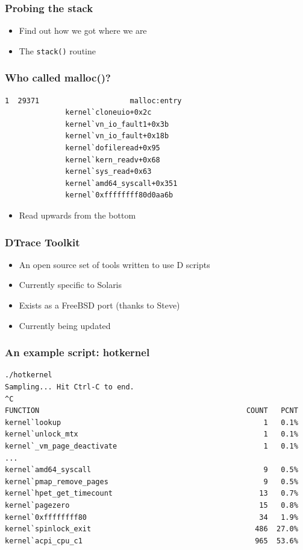 \documentclass[pdftex]{beamer} %
\begin{document}
\begin{frame}[fragile]
  \frametitle{Probing the stack}
  \begin{itemize}
  \item Find out how we got where we are
  \item The \verb+stack()+ routine
  \end{itemize}
\end{frame}

\begin{frame}[fragile]
  \frametitle{Who called malloc()?}
\begin{lstlisting}
1  29371                     malloc:entry 
              kernel`cloneuio+0x2c
              kernel`vn_io_fault1+0x3b
              kernel`vn_io_fault+0x18b
              kernel`dofileread+0x95
              kernel`kern_readv+0x68
              kernel`sys_read+0x63
              kernel`amd64_syscall+0x351
              kernel`0xffffffff80d0aa6b
\end{lstlisting}
  \begin{itemize}
  \item Read upwards from the bottom
  \end{itemize}
\end{frame}

\begin{frame}
  \frametitle{DTrace Toolkit}
  \begin{itemize}
  \item An open source set of tools written to use D scripts
  \item Currently specific to Solaris
  \item Exists as a FreeBSD port (thanks to Steve)
  \item Currently being updated
  \end{itemize}
\end{frame}

\begin{frame}[fragile]
  \frametitle{An example script: hotkernel}
\begin{lstlisting}
./hotkernel 
Sampling... Hit Ctrl-C to end.
^C
FUNCTION                                                COUNT   PCNT
kernel`lookup                                               1   0.1%
kernel`unlock_mtx                                           1   0.1%
kernel`_vm_page_deactivate                                  1   0.1%
...
kernel`amd64_syscall                                        9   0.5%
kernel`pmap_remove_pages                                    9   0.5%
kernel`hpet_get_timecount                                  13   0.7%
kernel`pagezero                                            15   0.8%
kernel`0xffffffff80                                        34   1.9%
kernel`spinlock_exit                                      486  27.0%
kernel`acpi_cpu_c1                                        965  53.6%
\end{lstlisting}
\end{frame}
\end{document}
